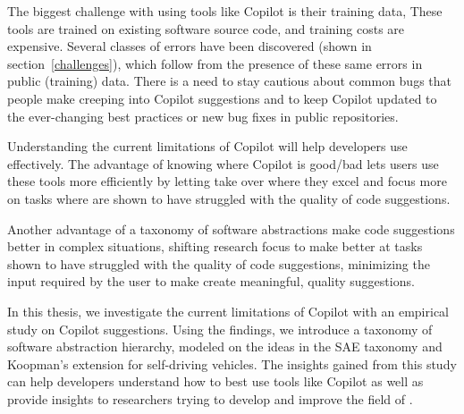 The biggest challenge with using tools like Copilot is their training data, These tools are trained on existing software source code, and training costs are expensive.
Several classes of errors have been discovered (shown in section~\ref{challenges}), which follow from the presence of these same errors in public (training) data. There is a need to stay cautious about common bugs that people make creeping into Copilot suggestions and to keep Copilot updated to the ever-changing best practices or new bug fixes in public repositories.

Understanding the current limitations of Copilot will help developers use \cct{} effectively. The advantage of knowing where Copilot is good/bad lets users use these tools more efficiently by letting \cct{} take over where they excel and focus more on tasks where \cct{} are shown to have struggled with the quality of code suggestions.

Another advantage of a taxonomy of software abstractions make code suggestions better in complex situations, shifting research focus to make \cct{} better at tasks shown to have struggled with the quality of code suggestions, minimizing the input required by the user to make \cct{} create meaningful, quality suggestions.

In this thesis, we investigate the current limitations of Copilot with an empirical study on Copilot suggestions. Using the findings, we introduce a taxonomy of software abstraction hierarchy, modeled on the ideas in the SAE taxonomy and Koopman's extension for self-driving vehicles. The insights gained from this study can help developers understand how to best use tools like Copilot as well as provide insights to researchers trying to develop and improve the field of \cct{}.




